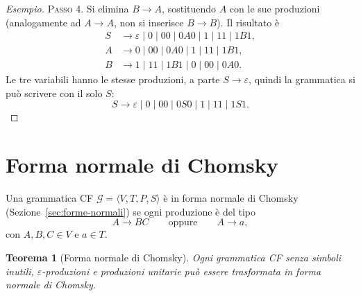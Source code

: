 \documentclass[a4paper, 11pt, oneside]{book}
\theoremstyle{formale}
\newtheorem{theorem}{Teorema}
\newenvironment{esempio}
    {\begin{proof}[\textit{Esempio}]\renewcommand{\qedsymbol}{$\diamond$}}
    {\end{proof}}
\begin{document}
\begin{esempio}
        \textsc{Passo 4}. Si elimina $B \to A$, sostituendo $A$ con le sue produzioni
        (analogamente ad $A \to A$, non si inserisce $B \to B$). Il risultato \`e
        \begin{align*}
            S &\to \varepsilon \mid 0 \mid 00 \mid 0A0 \mid 1 \mid 11 \mid 1B1, \\
            A &\to 0 \mid 00 \mid 0A0 \mid 1 \mid 11 \mid 1B1, \\
            B &\to 1 \mid 11 \mid 1B1 \mid 0 \mid 00 \mid 0A0.
        \end{align*}
        Le tre variabili hanno le stesse produzioni, a parte $S \to \varepsilon$, quindi
        la grammatica si pu\`o scrivere con il solo $S$:
        \begin{equation*}
            S \to \varepsilon \mid 0 \mid 00 \mid 0S0 \mid 1 \mid 11 \mid 1S1.
        \end{equation*}
    \end{esempio}

    \section{Forma normale di Chomsky}
    Una grammatica CF $\mathcal{G} = \langle V, T, P, S \rangle$ \`e in forma normale di
    Chomsky (Sezione~\ref{sec:forme-normali}) se ogni produzione \`e del tipo
    \begin{equation*}
        A \to BC \qquad \text{oppure} \qquad A \to a,
    \end{equation*}
    con $A, B, C \in V$ e $a \in T$.

    \begin{theorem}[Forma normale di Chomsky]
        \label{thm:chomsky}
        Ogni grammatica CF senza simboli inutili, $\varepsilon$-produzioni e produzioni
        unitarie pu\`o essere trasformata in forma normale di Chomsky.
    \end{theorem}
\end{document}
